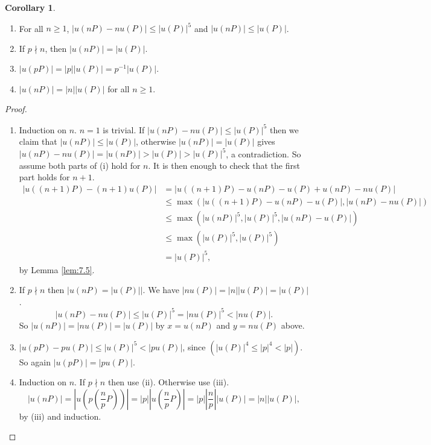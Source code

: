 \documentclass{article}
\newcommand{\rb}[1]{\left( #1 \right)}
\newcommand{\abs}[1]{\left\lvert #1 \right\rvert}
\theoremstyle{definition}\newtheorem{definition}{Definition}[section]
\theoremstyle{definition}\newtheorem{remark}[definition]{Remark}
\theoremstyle{definition}\newtheorem*{example}{Example}
\theoremstyle{definition}\newtheorem*{note}{Note}
\newtheorem{corollary}[definition]{Corollary}
\begin{document}
\begin{corollary}
\hfill
\begin{enumerate}
\item For all $ n \ge 1 $, $ \abs{u\rb{nP} - nu\rb{P}} \le \abs{u\rb{P}}^5 $ and $ \abs{u\rb{nP}} \le \abs{u\rb{P}} $.
\item If $ p \nmid n $, then $ \abs{u\rb{nP}} = \abs{u\rb{P}} $.
\item $ \abs{u\rb{pP}} = \abs{p}\abs{u\rb{P}} = p^{-1}\abs{u\rb{P}} $.
\item $ \abs{u\rb{nP}} = \abs{n}\abs{u\rb{P}} $ for all $ n \ge 1 $.
\end{enumerate}
\end{corollary}

\begin{proof}
\hfill
\begin{enumerate}
\item Induction on $ n $. $ n = 1 $ is trivial. If $ \abs{u\rb{nP} - nu\rb{P}} \le \abs{u\rb{P}}^5 $ then we claim that $ \abs{u\rb{nP}} \le \abs{u\rb{P}} $, otherwise $ \abs{u\rb{nP}} = \abs{u\rb{P}} $ gives $ \abs{u\rb{nP} - nu\rb{P}} = \abs{u\rb{nP}} > \abs{u\rb{P}} > \abs{u\rb{P}}^5 $, a contradiction. So assume both parts of (i) hold for $ n $. It is then enough to check that the first part holds for $ n + 1 $.
\begin{align*}
\abs{u\rb{\rb{n + 1}P} - \rb{n + 1}u\rb{P}}
& = \abs{u\rb{\rb{n + 1}P} - u\rb{nP} - u\rb{P} + u\rb{nP} - nu\rb{P}} \\
& \le \max\rb{\abs{u\rb{\rb{n + 1}P} - u\rb{nP} - u\rb{P}}, \abs{u\rb{nP} - nu\rb{P}}} \\
& \le \max\rb{\abs{u\rb{nP}}^5, \abs{u\rb{P}}^5, \abs{u\rb{nP} - u\rb{P}}} \\
& \le \max\rb{\abs{u\rb{P}}^5, \abs{u\rb{P}}^5} \\
& = \abs{u\rb{P}}^5,
\end{align*}
by Lemma \ref{lem:7.5}.
\item If $ p \nmid n $ then $ \abs{u\rb{nP} = \abs{u\rb{P}}} $. We have $ \abs{nu\rb{P}} = \abs{n}\abs{u\rb{P}} = \abs{u\rb{P}} $.
$$ \abs{u\rb{nP} - nu\rb{P}} \le \abs{u\rb{P}}^5 = \abs{nu\rb{P}}^5 < \abs{nu\rb{P}}. $$
So $ \abs{u\rb{nP}} = \abs{nu\rb{P}} = \abs{u\rb{P}} $ by $ x = u\rb{nP} $ and $ y = nu\rb{P} $ above.
\item $ \abs{u\rb{pP} - pu\rb{P}} \le \abs{u\rb{P}}^5 < \abs{pu\rb{P}} $, since $ \rb{\abs{u\rb{P}}^4 \le \abs{p}^4 < \abs{p}} $. So again $ \abs{u\rb{pP}} = \abs{pu\rb{P}} $.
\item Induction on $ n $. If $ p \nmid n $ then use (ii). Otherwise use (iii).
$$ \abs{u\rb{nP}} = \abs{u\rb{p\rb{\dfrac{n}{p}P}}} = \abs{p}\abs{u\rb{\dfrac{n}{p}P}} = \abs{p}\abs{\dfrac{n}{p}}\abs{u\rb{P}} = \abs{n}\abs{u\rb{P}}, $$
by (iii) and induction.
\end{enumerate}
\end{proof}
\end{document}

